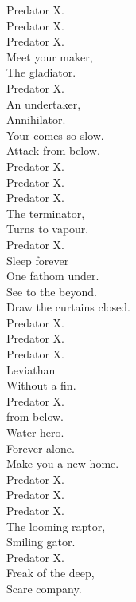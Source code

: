 



Predator X. \\
Predator X. \\
Predator X. \\
Meet your maker, \\
The gladiator. \\
Predator X. \\
An undertaker, \\
Annihilator. \\

Your  comes so slow. \\
Attack from below. \\

Predator X. \\
Predator X. \\
Predator X. \\
The terminator, \\
Turns to vapour. \\
Predator X. \\
Sleep forever \\
One fathom under. \\

See to the beyond. \\
Draw the curtains closed. \\

Predator X. \\
Predator X. \\
Predator X. \\
Leviathan \\
Without a fin. \\
Predator X. \\
 from below. \\
Water hero. \\

Forever alone. \\
Make you a new home. \\

Predator X. \\
Predator X. \\
Predator X. \\
The looming raptor, \\
Smiling gator. \\
Predator X. \\
Freak of the deep, \\
Scare company. \\

